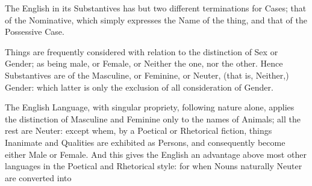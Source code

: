 The English in its Substantives has but two different terminations for
Cases; that of the Nominative, which simply expresses the Name of the
thing, and that of the Possessive Case.

Things are frequently considered with relation to the distinction of Sex
or Gender; as being male, or Female, or Neither the one, nor the other.
Hence Substantives are of the Masculine, or Feminine, or Neuter, (that
is, Neither,) Gender: which latter is only the exclusion of all
consideration of Gender.

The English Language, with singular propriety, following nature alone,
applies the distinction of Masculine and Feminine only to the names of
Animals; all the rest are Neuter: except whem, by a Poetical or
Rhetorical fiction, things Inanimate and Qualities are exhibited as
Persons, and consequently become either Male or Female. And this gives
the English an advantage above most other languages in the Poetical and
Rhetorical style: for when Nouns naturally Neuter are converted into
